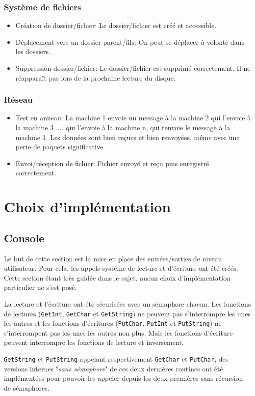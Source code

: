 \documentclass{article}
\begin{document}
		\subsubsection{Système de fichiers}
			\begin{itemize}
				\item Création de dossier/fichier: Le dossier/fichier est créé et accessible.
				\item Déplacement vers un dossier parent/fils: On peut se déplacer à volonté dans les dossiers.
				\item Suppression dossier/fichier: Le dossier/fichier est supprimé correctement. Il ne réapparaît pas lors de la prochaine lecture du disque.
			\end{itemize}

		\subsubsection{Réseau}
			\begin{itemize}
				\item Test en anneau: La machine 1 envoie un message à la machine 2 qui l'envoie à la machine 3 .... qui l'envoie à la machine n, qui renvoie le message à la machine 1.
					\subitem Les données sont bien reçues et bien renvoyées, même avec une perte de paquets significative.
				\item Envoi/réception de fichier: Fichier envoyé et reçu puis enregistré correctement.
			\end{itemize}

\section{Choix d'implémentation}
	\subsection{Console}
	  	{Le but de cette section est la mise en place des entrées/sorties de niveau utilisateur. Pour cela, les appels système de lecture et d'écriture ont été créés. Cette section étant très guidée dans le sujet, aucun choix d'implémentation particulier ne s'est posé.}
	     ~\par{La lecture et l'écriture ont été sécurisées avec un sémaphore chacun. Les fonctions de lectures (\texttt{GetInt}, \texttt{GetChar} et \texttt{GetString}) ne peuvent pas s'interrompre les unes les autres et les fonctions d'écritures (\texttt{PutChar}, \texttt{PutInt} et \texttt{PutString}) ne s'interrompent pas les unes les autres non plus. Mais les fonctions d'écriture peuvent interrompre les fonctions de lecture et inversement.}
		~\par{\texttt{GetString} et \texttt{PutString} appelant respectivement \texttt{GetChar} et \texttt{PutChar}, des versions internes "\emph{sans sémaphore}" de ces deux dernières routines ont été implémentées pour pouvoir les appeler depuis les deux premières sans récursion de sémaphores.}
\end{document}
